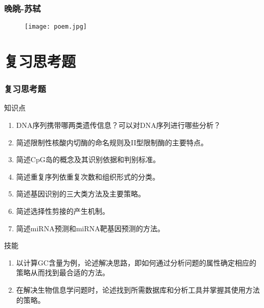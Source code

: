 \begin{frame}
  \frametitle{晚眺-苏轼}
  \begin{figure}
    \centering
    \texttt{[image: poem.jpg]}
  \end{figure}
\end{frame}

\section{复习思考题}
\begin{frame}
  \frametitle{复习思考题}
  \begin{block}{知识点}
  \begin{enumerate}
    \item DNA序列携带哪两类遗传信息？可以对DNA序列进行哪些分析？
    \item 简述限制性核酸内切酶的命名规则及II型限制酶的主要特点。
    \item 简述CpG岛的概念及其识别依据和判别标准。
    \item 简述重复序列依重复次数和组织形式的分类。
    \item 简述基因识别的三大类方法及主要策略。
    \item 简述选择性剪接的产生机制。
    \item 简述miRNA预测和miRNA靶基因预测的方法。
  \end{enumerate}
\end{block}
\pause
\begin{block}{技能}
  \begin{enumerate}
    \item 以计算GC含量为例，论述解决思路，即如何通过分析问题的属性确定相应的策略从而找到最合适的方法。
    \item 在解决生物信息学问题时，论述找到所需数据库和分析工具并掌握其使用方法的策略。
  \end{enumerate}
\end{block}
\end{frame}

